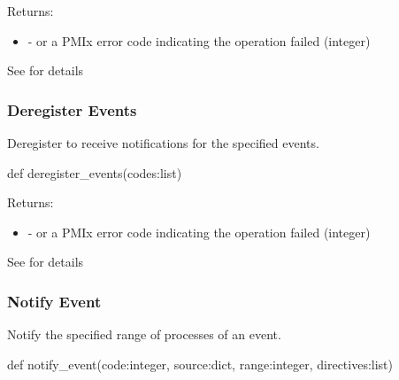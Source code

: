 Returns:
\begin{itemize}
    \item {} -  or a \ac{PMIx} error code indicating the operation failed (integer)
\end{itemize}

See  for details


\subsubsection{Deregister Events}

\summary

Deregister to receive notifications for the specified events.

\format

\pyspecificstart
\begin{codepar}
def deregister_events(codes:list)
\end{codepar}
\pyspecificend

\begin{arglist}
\end{arglist}

Returns:
\begin{itemize}
    \item {} -  or a \ac{PMIx} error code indicating the operation failed (integer)
\end{itemize}

See  for details


\subsubsection{Notify Event}

\summary

Notify the specified range of processes of an event.

\format

\pyspecificstart
\begin{codepar}
def notify_event(code:integer, source:dict, range:integer, directives:list)
\end{codepar}
\pyspecificend

\begin{arglist}
\end{arglist}


